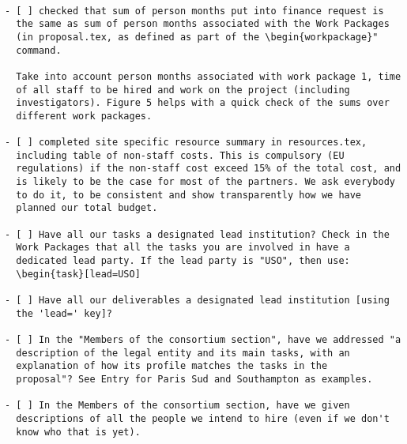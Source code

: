 \begin{draft}
\\
\vspace{1cm}

\begin{verbatim}
- [ ] checked that sum of person months put into finance request is
  the same as sum of person months associated with the Work Packages
  (in proposal.tex, as defined as part of the \begin{workpackage}"
  command.

  Take into account person months associated with work package 1, time
  of all staff to be hired and work on the project (including
  investigators). Figure 5 helps with a quick check of the sums over
  different work packages.

- [ ] completed site specific resource summary in resources.tex,
  including table of non-staff costs. This is compulsory (EU
  regulations) if the non-staff cost exceed 15% of the total cost, and
  is likely to be the case for most of the partners. We ask everybody
  to do it, to be consistent and show transparently how we have
  planned our total budget.

- [ ] Have all our tasks a designated lead institution? Check in the
  Work Packages that all the tasks you are involved in have a
  dedicated lead party. If the lead party is "USO", then use:
  \begin{task}[lead=USO]

- [ ] Have all our deliverables a designated lead institution [using
  the 'lead=' key]?

- [ ] In the "Members of the consortium section", have we addressed "a
  description of the legal entity and its main tasks, with an
  explanation of how its profile matches the tasks in the
  proposal"? See Entry for Paris Sud and Southampton as examples.

- [ ] In the Members of the consortium section, have we given
  descriptions of all the people we intend to hire (even if we don't
  know who that is yet).
\end{verbatim}
\end{draft}




